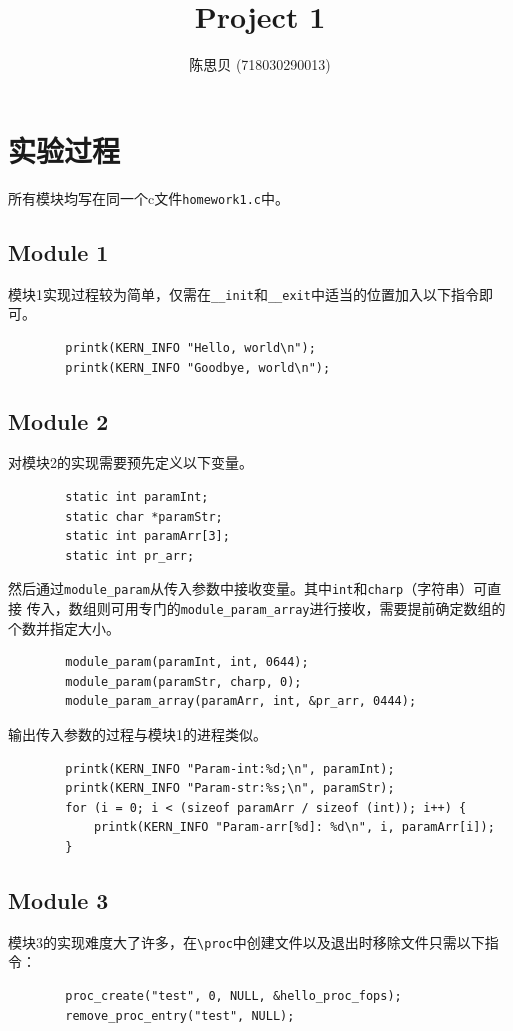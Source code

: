 \documentclass[UTF8]{ctexrep}
\title{
    \horrule{0.5pt} \\[0.4cm]
    \huge Project 1 \\
    \horrule{2pt}
}
\author{
    陈思贝 (718030290013)
}
\date{
}
\begin{document}
    \maketitle
    \section{实验过程}
    所有模块均写在同一个c文件\lstinline{homework1.c}中。\\
    
    \subsection{Module 1}
    模块1实现过程较为简单，仅需在\lstinline{__init}和\lstinline{__exit}中适当的位置加入以下指令即可。
    \begin{lstlisting}
        printk(KERN_INFO "Hello, world\n");
        printk(KERN_INFO "Goodbye, world\n");
    \end{lstlisting}

    \subsection{Module 2}
    对模块2的实现需要预先定义以下变量。
    \begin{lstlisting}
        static int paramInt;
        static char *paramStr;
        static int paramArr[3];
        static int pr_arr;
    \end{lstlisting}

    然后通过\lstinline{module_param}从传入参数中接收变量。其中\lstinline{int}和\lstinline{charp}（字符串）可直接
    传入，数组则可用专门的\lstinline{module_param_array}进行接收，需要提前确定数组的个数并指定大小。
    \begin{lstlisting}
        module_param(paramInt, int, 0644);
        module_param(paramStr, charp, 0);
        module_param_array(paramArr, int, &pr_arr, 0444);
    \end{lstlisting}

    输出传入参数的过程与模块1的进程类似。
    \begin{lstlisting}
        printk(KERN_INFO "Param-int:%d;\n", paramInt);
        printk(KERN_INFO "Param-str:%s;\n", paramStr);
        for (i = 0; i < (sizeof paramArr / sizeof (int)); i++) {
            printk(KERN_INFO "Param-arr[%d]: %d\n", i, paramArr[i]);
        }
    \end{lstlisting}

    \subsection{Module 3}
    模块3的实现难度大了许多，在\lstinline{\proc}中创建文件以及退出时移除文件只需以下指令：
    \begin{lstlisting}
        proc_create("test", 0, NULL, &hello_proc_fops);
        remove_proc_entry("test", NULL);
    \end{lstlisting}
    
\end{document}
